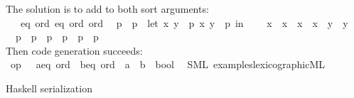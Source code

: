 \begin{isabellebody}
\begin {description}
  The solution is to add  to both sort arguments: \\
\isamarkupfalse%
\ {\isacharasterisk}\ {\isacharcolon}{\isacharcolon}\ {\isacharparenleft}{\isachardoublequoteopen}{\isacharbraceleft}eq{\isacharcomma}\ ord{\isacharbraceright}{\isachardoublequoteclose}{\isacharcomma}\ {\isachardoublequoteopen}{\isacharbraceleft}eq{\isacharcomma}\ ord{\isacharbraceright}{\isachardoublequoteclose}{\isacharparenright}\ ord\isanewline
\ \ {\isachardoublequoteopen}p{}\ {\isacharless}\ p{}\ {\isasymequiv}\ let\ {\isacharparenleft}x{}{\isacharcomma}\ y{}{\isacharparenright}\ {\isacharequal}\ p{}{\isacharsemicolon}\ {\isacharparenleft}x{}{\isacharcomma}\ y{}{\isacharparenright}\ {\isacharequal}\ p{}\ in\isanewline
\ \ \ \ x{}\ {\isacharless}\ x{}\ {\isasymor}\ {\isacharparenleft}x{}\ {\isacharequal}\ x{}\ {\isasymand}\ y{}\ {\isacharless}\ y{}{\isacharparenright}{\isachardoublequoteclose}\isanewline
\ \ {\isachardoublequoteopen}p{}\ {\isasymle}\ p{}\ {\isasymequiv}\ p{}\ {\isacharless}\ p{}\ {\isasymor}\ p{}\ {\isacharequal}\ p{}{\isachardoublequoteclose}%
\isadelimproof
\ %
\endisadelimproof
%
\isatagproof
\isacommand{{\isachardot}{\isachardot}}\isamarkupfalse%
%
\endisatagproof
{\isafoldproof}%
%
\isadelimproof
%
\endisadelimproof
%
\\ Then code generation succeeds: \\
\isamarkupfalse%
\ {\isachardoublequoteopen}op\ {\isasymle}\ {\isasymColon}\ {\isacharprime}a{\isasymColon}{\isacharbraceleft}eq{\isacharcomma}\ ord{\isacharbraceright}\ {\isasymtimes}\ {\isacharprime}b{\isasymColon}{\isacharbraceleft}eq{\isacharcomma}\ ord{\isacharbraceright}\ {\isasymRightarrow}\ {\isacharprime}a\ {\isasymtimes}\ {\isacharprime}b\ {\isasymRightarrow}\ bool{\isachardoublequoteclose}\isanewline
\ \ {\isacharparenleft}SML\ {\isachardoublequoteopen}examples{\isacharslash}lexicographic{\isachardot}ML{\isachardoublequoteclose}{\isacharparenright}%
\begin{isamarkuptext}%
%
\end{isamarkuptext}%
\isamarkuptrue%
%
\item[Haskell serialization]
%
\end {description}
%
\end{isabellebody}

